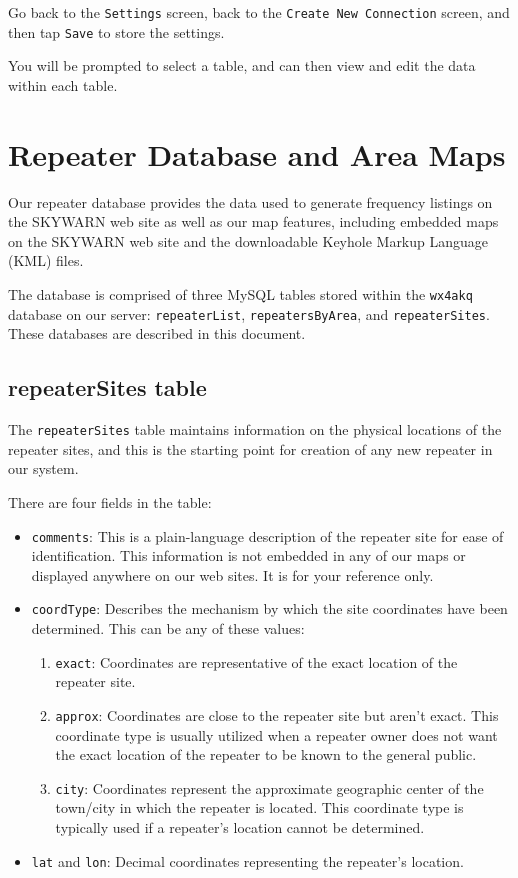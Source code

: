 \documentclass[pdflatex,letterpaper,twoside,12pt]{book}
\begin{document}
Go back to the \texttt{Settings} screen, back to the \texttt{Create New Connection} screen, and then tap \texttt{Save} to store the settings.

You will be prompted to select a table, and can then view and edit the data within each table.


\section{Repeater Database and Area Maps}

Our repeater database provides the data used to generate frequency listings on the SKYWARN web site as well as our map features, including embedded maps on the SKYWARN web site and the downloadable Keyhole Markup Language (KML) files.

The database is comprised of three MySQL tables stored within the \texttt{wx4akq} database on our server: \texttt{repeaterList}, \texttt{repeatersByArea}, and \texttt{repeaterSites}.  These databases are described in this document.

\subsection{repeaterSites table}

The \texttt{repeaterSites} table maintains information on the physical locations of the repeater sites, and this is the starting point for creation of any new repeater in our system.

There are four fields in the table:

\begin{itemize}
\item \texttt{comments}: This is a plain-language description of the repeater site for ease of identification.  This information is not embedded in any of our maps or displayed anywhere on our web sites.  It is for your reference only.

\item \texttt{coordType}:  Describes the mechanism by which the site coordinates have been determined.  This can be any of these values:
	\begin{enumerate}
	\item \texttt{exact}: Coordinates are representative of the exact location of the repeater site.
	\item \texttt{approx}: Coordinates are close to the repeater site but aren't exact. This coordinate type is usually utilized when a repeater owner does not want the exact location of the repeater to be known to the general public.
	\item \texttt{city}: Coordinates represent the approximate geographic center of the town/city in which the repeater is located.  This coordinate type is typically used if a repeater's location cannot be determined.
	\end{enumerate}
\item \texttt{lat} and \texttt{lon}: Decimal coordinates representing the repeater's location.
\end{itemize}
\end{document}

